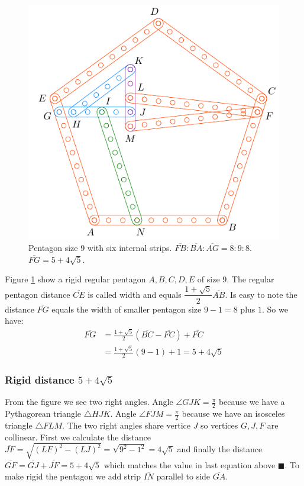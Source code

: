 \documentclass[11pt]{article}
\begin{document}
\begin{figure}[H]
 \centering
 \includegraphics[scale=0.95]{9/penta9a}
 \caption{Pentagon size 9 with six internal strips. $\overline{FB}:\overline{BA}:\overline{AG} = 8:9:8$. $\overline{FG}=5+4\sqrt5$. }
 \label{fig:penta9a}
\end{figure}

Figure \ref{fig:penta9a} show a rigid regular pentagon $A,B,C,D,E$ of size $9$. The regular pentagon distance $\overline{CE}$ is called width and equals $\dfrac{1+\sqrt5}{2}\overline{AB}$. Is easy to note the distance $\overline{FG}$ equals the width of smaller pentagon size $9-1=8$ plus $1$. So we have:
\begin{align}
\overline{FG} &= \frac{1+\sqrt5}{2}(\overline{BC}-\overline{FC}) + \overline{FC}\nonumber\\
 &= \frac{1+\sqrt5}{2}(9-1) + 1 = 5 + 4\sqrt5
\end{align}

\subsubsection{Rigid distance $5 + 4\sqrt5$}

From the figure we see two right angles. Angle $\angle{GJK}=\frac{\pi}2$ because we have a Pythagorean triangle $\triangle{HJK}$. Angle $\angle{FJM}=\frac{\pi}2$ because we have an isosceles triangle $\triangle{FLM}$. The two right angles share vertice $J$ so vertices $G,J,F$ are collinear. First we calculate the distance $\overline{JF} = \sqrt{(LF)^2 - (LJ)^2} = \sqrt{9^2-1^2} = 4\sqrt5$ and finally the distance $\overline{GF} = \overline{GJ} + \overline{JF} = 5 + 4\sqrt5$ which matches the value in last equation above $\blacksquare$. To make rigid the pentagon we add strip $\overline{IN}$ parallel to side $\overline{GA}$.
\end{document}
